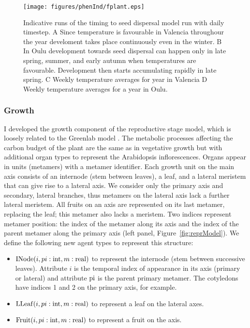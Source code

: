 \begin{figure}[tb]
  \centering
  \texttt{[image: figures/phenInd/fplant.eps]}
  \caption{Indicative runs of the timing to seed dispersal model run with daily
    timestep. A Since temperature is favourable in Valencia throughour the year
    develoment takes place continuously even in the winter. B In Oulu
    development towards seed dispersal can happen only in late spring, summer,
    and early autumn when temperatures are favourable. Development then starts
    accumulating rapidly in late spring. C Weekly temperature averages for year
    in Valencia D Weekly temperature averages for a year in Oulu.}
  \label{fig:reprInd}
\end{figure}

\subsubsection*{Growth}
\label{growth-1}

I developed the growth component of the reproductive stage model, which is
loosely related to the Greenlab model \citep{christophe_model-based_2008}. The
metabolic processes affecting the carbon budget of the plant are the same as in
vegetative growth but with additional organ types to represent the Arabidopsis
inflorescences. Organs appear in units (metamers) with a metamer
identifier. Each growth unit on the main axis consists of an internode (stem
between leaves), a leaf, and a lateral meristem that can give rise to a lateral
axis. We consider only the primary axis and secondary, lateral branches, thus
metamers on the lateral axis lack a further lateral meristem. All fruits on an
axis are represented on its last metamer, replacing the leaf; this metamer also
lacks a meristem.  Two indices represent metamer position: the index of the
metamer along its axis and the index of the parent metamer along the primary
axis (left panel, Figure~\ref{fig:reprModel}). We define the following new agent
types to represent this structure:

\begin{itemize}
\item
  \(\mathrm{INode}(i,pi:\mathrm{int},m:\mathrm{real})\) to represent the
  internode (stem between successive leaves). Attribute \(i\) is the
  temporal index of appearance in its axis (primary or lateral) and
  attribute \(\mathrm{pi}\) is the parent primary metamer. The cotyledons
  have indices 1 and 2 on the primary axis, for example.
\item
  \(\mathrm{LLeaf}(i,pi:\mathrm{int},m:\mathrm{real})\) to represent a leaf on
  the lateral axes.
\item
  \(\mathrm{Fruit}(i,pi:\mathrm{int},m:\mathrm{real})\) to represent a fruit
  on the axis.
\end{itemize}

